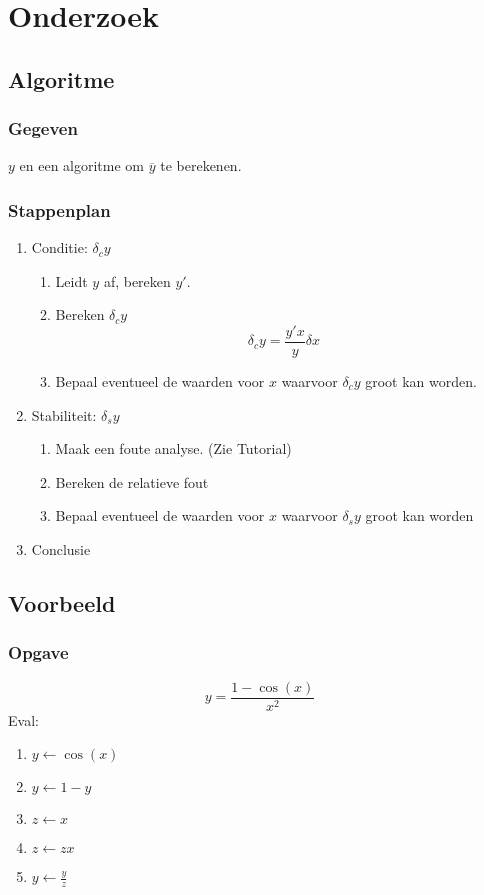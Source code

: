 \documentclass[10pt,a4paper]{article}
\begin{document}
\section{Onderzoek}
\subsection{Algoritme}
\subsubsection{Gegeven}
$y$ en een algoritme om $\overline{y}$ te berekenen.
\subsubsection{Stappenplan}
\begin{enumerate}
\item Conditie: $\delta_c y$
\begin{enumerate}
\item Leidt $y$ af, bereken $y'$.
\item Bereken $\delta_c y$
\[
\delta_c y = \frac{y'x}{y}\delta x
\]
\item Bepaal eventueel de waarden voor $x$ waarvoor $\delta_c y$ groot kan worden.
\end{enumerate}

\item Stabiliteit: $\delta_s y$
\begin{enumerate}
\item Maak een foute analyse. (Zie Tutorial)
\item Bereken de relatieve fout
\item Bepaal eventueel de waarden voor $x$ waarvoor $\delta_s y$ groot kan worden
\end{enumerate}

\item Conclusie
\end{enumerate}

\subsection{Voorbeeld}
\subsubsection{Opgave}
\[
y = \frac{1-\cos(x)}{x^2}
\]
Eval:
\begin{enumerate}
\item $y \leftarrow \cos(x)$
\item $y \leftarrow 1-y$
\item $z \leftarrow x$
\item $z \leftarrow zx$
\item $y \leftarrow \frac{y}{z}$
\end{enumerate}
\end{document}
